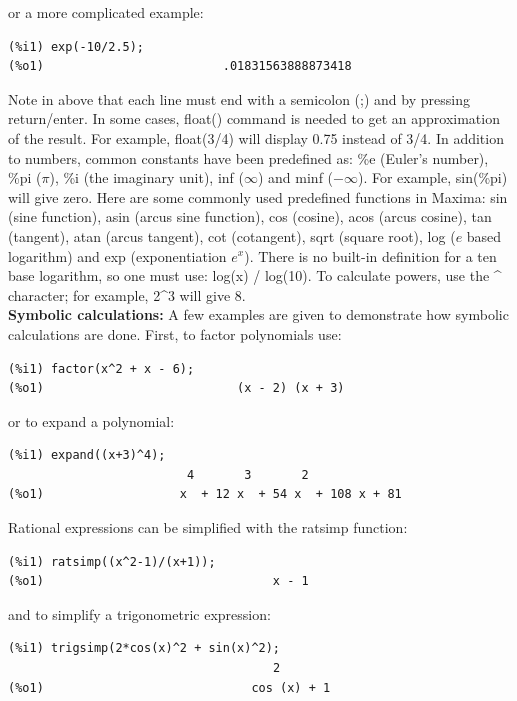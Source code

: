 \documentclass[byrevtex,amssymb,aps,pra,floatfix,letterpaper]{revtex4}
\begin{document}
\noindent
or a more complicated example:

\begin{verbatim}
(%i1) exp(-10/2.5);
(%o1)                         .01831563888873418
\end{verbatim}

\noindent
Note in above that each line must end with a semicolon (;) and by pressing return/enter. In some cases, float() command is needed to get an approximation of the result. For example, float(3/4) will display 0.75 instead of 3/4. In addition to numbers, common constants have been predefined as: \%e (Euler's number), \%pi ($\pi$), \%i (the imaginary unit), inf ($\infty$) and minf ($-\infty$). For example, sin(\%pi) will give zero. Here are some commonly used predefined functions in Maxima: sin (sine function), asin (arcus sine function), cos (cosine), acos (arcus cosine), tan (tangent), atan (arcus tangent), cot (cotangent), sqrt (square root), log ($e$ based logarithm) and exp (exponentiation $e^x$). There is no built-in definition for a ten base logarithm, so one must use: log(x) / log(10). To calculate powers, use the \^{} character; for example, 2\^{}3 will give 8.\\

\noindent
\textbf{Symbolic calculations:} A few examples are given to demonstrate how symbolic calculations are done. First, to factor polynomials use:

\begin{verbatim}
(%i1) factor(x^2 + x - 6);
(%o1)                           (x - 2) (x + 3)
\end{verbatim}

\noindent
or to expand a polynomial:

\begin{verbatim}
(%i1) expand((x+3)^4);
                         4       3       2
(%o1)                   x  + 12 x  + 54 x  + 108 x + 81
\end{verbatim}

\noindent
Rational expressions can be simplified with the ratsimp function:

\begin{verbatim}
(%i1) ratsimp((x^2-1)/(x+1));
(%o1)                                x - 1
\end{verbatim}

\noindent
and to simplify a trigonometric expression:

\begin{verbatim}
(%i1) trigsimp(2*cos(x)^2 + sin(x)^2);
                                     2
(%o1)                             cos (x) + 1
\end{verbatim}
\end{document}
